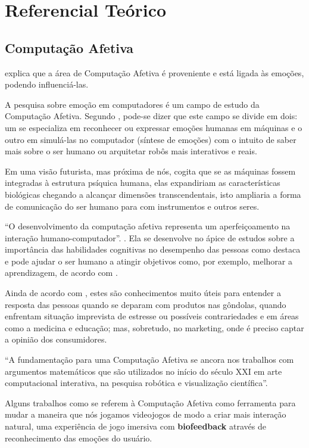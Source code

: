 \documentclass[
    12pt,                   %
    openright,              %
    oneside,                %
    a4paper,                %
    sumario=tradicional,    %
    english,                %
    brazil,                 %
    ]{abntex2}
\begin{document}
\chapter{Referencial Teórico}\label{sec:RefTeorico}
\section{Computação Afetiva}

 explica que a área de Computação Afetiva é proveniente e está ligada às emoções, podendo influenciá-las. 

A pesquisa sobre emoção em computadores é um campo de estudo da Computação Afetiva. Segundo , pode-se dizer que este campo se divide em dois: um se especializa em reconhecer ou expressar emoções humanas em máquinas e o outro em simulá-las no computador (síntese de emoções) com o intuito de saber mais sobre o ser humano ou arquitetar robôs mais interativos e reais. 

Em uma visão futurista, mas próxima de nós,  cogita que se as máquinas fossem integradas à estrutura psíquica humana, elas expandiriam as características biológicas chegando a alcançar dimensões transcendentais, isto ampliaria a forma de comunicação do ser humano para com instrumentos e outros seres. 

``O desenvolvimento da computação afetiva representa um aperfeiçoamento na interação humano-computador''. \cite{amadeu2humano}. Ela se desenvolve no ápice de estudos sobre a importância das habilidades cognitivas no desempenho das pessoas como destaca  e pode ajudar o ser humano a atingir objetivos como, por exemplo, melhorar a aprendizagem, de acordo com .

Ainda de acordo com , estes são conhecimentos muito úteis para entender a resposta das pessoas quando se deparam com produtos nas gôndolas, quando enfrentam situação imprevista de estresse ou possíveis contrariedades e em áreas como a medicina e educação; mas, sobretudo, no marketing, onde é preciso captar a opinião dos consumidores.

``A fundamentação para uma Computação Afetiva se ancora nos trabalhos com argumentos matemáticos que são utilizados no início do século XXI em arte computacional interativa, na pesquisa robótica e visualização científica''.\cite{Louro2014}

Alguns trabalhos como  se referem à Computação Afetiva como ferramenta para mudar a maneira que nós jogamos videojogos de modo a criar mais interação natural, uma experiência de jogo imersiva com \textbf{biofeedback} através de reconhecimento das emoções do usuário.
\end{document}
